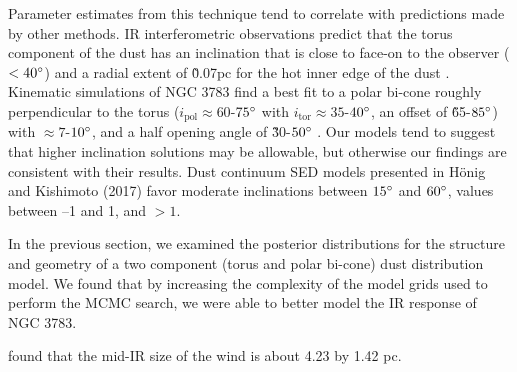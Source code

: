\par Parameter estimates from this technique tend to correlate with predictions made by other methods. IR interferometric observations predict that the torus component of the dust has an inclination that is close to face-on to the observer (\inc $< 40\degree$) and a radial extent of \~0.07pc for the hot inner edge of the dust \citep{gravity_collaboration_central_2021}.  Kinematic simulations of NGC 3783 find a best fit to a polar bi-cone roughly perpendicular to the torus ($i_{\text{pol}} \approx 60$-$75\degree$ with $i_{\text{tor}} \approx 35$-$40\degree$, an offset of \~65-$85\degree$) with \sigpol $\approx 7$-$10\degree$, and a half opening angle of \~30-$50\degree$ \citep{fischer_determining_2013}. Our models tend to suggest that higher inclination solutions may be allowable, but otherwise our findings are consistent with their results. Dust continuum SED models presented in Hönig and Kishimoto (2017) favor moderate inclinations between $15\degree$ and $60\degree$, \p values between –1 and 1, and \ppol $> 1$.


\par In the previous section, we examined the posterior distributions for the structure and geometry of a two component (torus and polar bi-cone) dust distribution model. We found that by increasing the complexity of the model grids used to perform the MCMC search, we were able to better model the IR response of NGC 3783. 
\par \cite{hoenig_dust_2013} found that the mid-IR size of the wind is about 4.23 by 1.42 pc.

